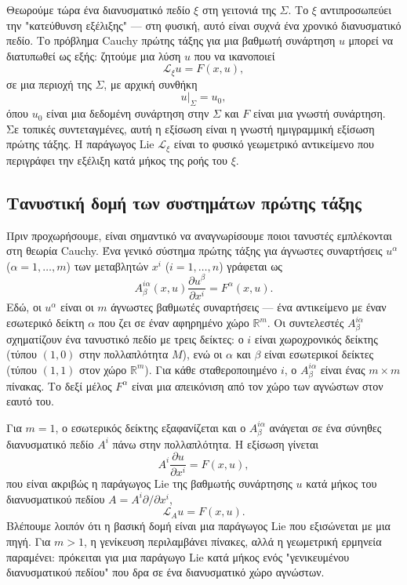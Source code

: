 \documentclass[12pt]{article}
\begin{document}
Θεωρούμε τώρα ένα διανυσματικό πεδίο $\xi$ στη γειτονιά της $\Sigma$. Το $\xi$ αντιπροσωπεύει την "κατεύθυνση εξέλιξης" — στη φυσική, αυτό είναι συχνά ένα χρονικό διανυσματικό πεδίο. Το πρόβλημα Cauchy πρώτης τάξης για μια βαθμωτή συνάρτηση $u$ μπορεί να διατυπωθεί ως εξής: ζητούμε μια λύση $u$ που να ικανοποιεί
\begin{equation}
\mathcal{L}_\xi u = F(x, u),
\end{equation}
σε μια περιοχή της $\Sigma$, με αρχική συνθήκη
\begin{equation}
u|_{\Sigma} = u_0,
\end{equation}
όπου $u_0$ είναι μια δεδομένη συνάρτηση στην $\Sigma$ και $F$ είναι μια γνωστή συνάρτηση. Σε τοπικές συντεταγμένες, αυτή η εξίσωση είναι η γνωστή ημιγραμμική εξίσωση πρώτης τάξης. Η παράγωγος Lie $\mathcal{L}_\xi$ είναι το φυσικό γεωμετρικό αντικείμενο που περιγράφει την εξέλιξη κατά μήκος της ροής του $\xi$.

\subsection{Τανυστική δομή των συστημάτων πρώτης τάξης}

Πριν προχωρήσουμε, είναι σημαντικό να αναγνωρίσουμε ποιοι τανυστές εμπλέκονται στη θεωρία Cauchy. Ένα γενικό σύστημα πρώτης τάξης για άγνωστες συναρτήσεις $u^\alpha$ ($\alpha = 1, \dots, m$) των μεταβλητών $x^i$ ($i = 1, \dots, n$) γράφεται ως
\begin{equation}
A^{i \alpha}_\beta(x, u) \frac{\partial u^\beta}{\partial x^i} = F^\alpha(x, u).
\end{equation}
Εδώ, οι $u^\alpha$ είναι οι $m$ άγνωστες βαθμωτές συναρτήσεις — ένα αντικείμενο με έναν εσωτερικό δείκτη $\alpha$ που ζει σε έναν αφηρημένο χώρο $\mathbb{R}^m$. Οι συντελεστές $A^{i \alpha}_\beta$ σχηματίζουν ένα τανυστικό πεδίο με τρεις δείκτες: ο $i$ είναι χωροχρονικός δείκτης (τύπου $(1,0)$ στην πολλαπλότητα $M$), ενώ οι $\alpha$ και $\beta$ είναι εσωτερικοί δείκτες (τύπου $(1,1)$ στον χώρο $\mathbb{R}^m$). Για κάθε σταθεροποιημένο $i$, ο $A^{i \alpha}_\beta$ είναι ένας $m \times m$ πίνακας. Το δεξί μέλος $F^\alpha$ είναι μια απεικόνιση από τον χώρο των αγνώστων στον εαυτό του.

Για $m=1$, ο εσωτερικός δείκτης εξαφανίζεται και ο $A^{i \alpha}_\beta$ ανάγεται σε ένα σύνηθες διανυσματικό πεδίο $A^i$ πάνω στην πολλαπλότητα. Η εξίσωση γίνεται
\begin{equation}
A^i \frac{\partial u}{\partial x^i} = F(x, u),
\end{equation}
που είναι ακριβώς η παράγωγος Lie της βαθμωτής συνάρτησης $u$ κατά μήκος του διανυσματικού πεδίου $A = A^i \partial / \partial x^i$,
\begin{equation}
\mathcal{L}_A u = F(x, u).
\end{equation}
Βλέπουμε λοιπόν ότι η βασική δομή είναι μια παράγωγος Lie που εξισώνεται με μια πηγή. Για $m>1$, η γενίκευση περιλαμβάνει πίνακες, αλλά η γεωμετρική ερμηνεία παραμένει: πρόκειται για μια παράγωγο Lie κατά μήκος ενός "γενικευμένου διανυσματικού πεδίου" που δρα σε ένα διανυσματικό χώρο αγνώστων.
\end{document}
